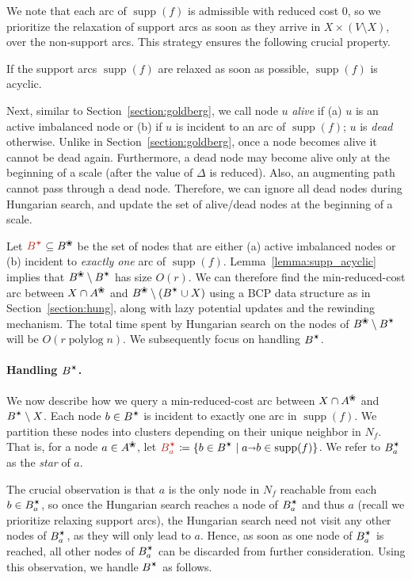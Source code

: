 \documentclass[11pt,twoside]{article}
\makeatletter
\def\polylog{\mathop{\mathrm{polylog}}}
\def\arcto{\mathord\shortrightarrow}
\def\arc#1#2{#1\arcto#2}
\def\supp{\operatorname{supp}}
\def\alive#1{{#1}^\text{\ding{96}}}
\def\star{\text{\ding{84}}}
\theoremstyle{plain}
\numberwithin{figure}{section}
\renewcommand{\subparagraph}{\paragraph}
\def\EMPH#1{\textcolor{BrickRed}{{\emph{#1}}}}
\def\n@te#1{\textsf{\boldmath \textbf{$\langle\!\langle$#1$\rangle\!\rangle$}}\leavevmode}
\def\note#1{\textcolor{red}{\n@te{#1}}}
\makeatother
\begin{document}
We note that each arc of $\supp(f)$ is admissible with reduced cost $0$,
so we prioritize the relaxation of support arcs as soon as they arrive in
$X \times (V \setminus X)$, over the non-support arcs.
This strategy ensures the following crucial property.

\begin{lemma}
\label{lemma:supp_acyclic}
If the support arcs $\supp(f)$ are relaxed as soon as possible, $\supp(f)$ is acyclic.
\end{lemma}

Next, similar to Section~\ref{section:goldberg}, we call node $u$
\EMPH{alive} if (a) $u$ is an active imbalanced node or (b) if $u$ is incident to
an arc of $\supp(f)$; $u$ is \EMPH{dead} otherwise.
Unlike in Section~\ref{section:goldberg}, once a node becomes alive it cannot
be dead again.
Furthermore, a dead node may become alive only at the beginning of a scale
(after the value of $\Delta$ is reduced).
Also, an augmenting path cannot pass through a dead node.
Therefore, we can ignore all dead nodes during Hungarian search,
and update the set of alive/dead nodes at the beginning of a scale.

Let $\EMPH{$B^\star$} \subseteq \alive{B}$ be the set of nodes that are either (a) active
imbalanced nodes or (b) incident to \emph{exactly one} arc of $\supp(f)$.
Lemma~\ref{lemma:supp_acyclic} implies that $\alive{B} \setminus B^\star$ has size $O(r)$.
%
We can therefore find the min-reduced-cost arc between $X \cap \alive{A}$ and $\alive{B} \setminus (B^\star \cup X)$
using a BCP data structure as in Section~\ref{section:hung}, along with lazy
potential updates and the rewinding mechanism.
The total time spent by Hungarian search on the nodes of $\alive{B} \setminus B^\star$ will be $O(r\polylog n)$.
We subsequently focus on handling $B^\star$.

\subparagraph{Handling \EMPH{$B^\star$}.}
We now describe how we query a min-reduced-cost arc between $X \cap \alive{A}$
and $B^\star \setminus X$.
Each node $b \in B^\star$ is incident to exactly one arc in
$\supp(f)$.
We partition these nodes into clusters depending on their unique neighbor in $N_f$.
That is, for a node $a \in \alive{A}$,
let $\EMPH{$B_a^\star$} \coloneqq \{b \in B^\star \mid {\arc ab} \in \supp(f)\}$.
We refer to $B_a^\star$ as the \EMPH{star} of $a$.

The crucial observation is that $a$ is the only node in $N_f$ reachable from
each $b \in B_a^\star$, so once the Hungarian search reaches a node of $B_a^\star$ and thus
$a$ (recall we prioritize relaxing support arcs), the Hungarian search need
not visit any other nodes of $B_a^\star$, as they will only lead to $a$.
Hence, as soon as one node of $B_a^\star$ is reached, all other nodes of $B_a^\star$ can be
discarded from further consideration.
Using this observation, we handle $B^\star$ as follows.
\end{document}
